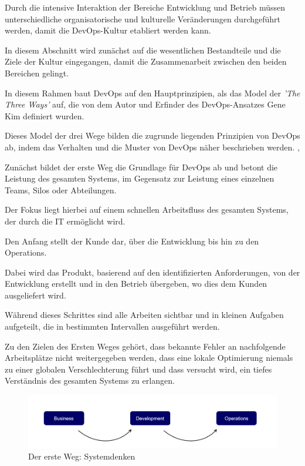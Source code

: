 Durch die intensive Interaktion der Bereiche Entwicklung und Betrieb müssen unterschiedliche organisatorische und kulturelle Veränderungen durchgeführt werden, damit die DevOps-Kultur etabliert werden kann. 

In diesem Abschnitt wird zunächst auf die wesentlichen Bestandteile und die Ziele der Kultur eingegangen, damit die Zusammenarbeit zwischen den beiden Bereichen gelingt.

In diesem Rahmen baut DevOps auf den Hauptprinzipien, als das Model der \textit{'The Three Ways'} auf, die von dem Autor und Erfinder des DevOps-Ansatzes Gene Kim \cite{kim_devops-handbuch_2017} definiert wurden. 

Dieses Model der drei Wege bilden die zugrunde liegenden Prinzipien von DevOps ab, indem das Verhalten und die Muster von DevOps näher beschrieben werden. \cite[S. 9 - 11]{kim_devops-handbuch_2017}, \cite{kim_three_2012}  

Zunächst bildet der erste Weg die Grundlage für DevOps ab und betont die Leistung des gesamten Systems, im Gegensatz zur Leistung eines einzelnen Teams, Silos oder Abteilungen. 

Der Fokus liegt hierbei auf einem schnellen Arbeitsfluss des gesamten Systems, der durch die IT ermöglicht wird. 

Den Anfang stellt der Kunde dar, über die Entwicklung bis hin zu den Operations.

Dabei wird das Produkt, basierend auf den identifizierten Anforderungen, von der Entwicklung erstellt und in den Betrieb übergeben, wo dies dem Kunden ausgeliefert wird. 

Während dieses Schrittes sind alle Arbeiten sichtbar und in kleinen Aufgaben aufgeteilt, die in bestimmten Intervallen ausgeführt werden. 

Zu den Zielen des Ersten Weges gehört, dass bekannte Fehler an nachfolgende Arbeitsplätze nicht weitergegeben werden, dass eine lokale Optimierung niemals zu einer globalen Verschlechterung führt und dass versucht wird, ein tiefes Verständnis des gesamten Systems zu erlangen. 

\begin{figure}[h]
    \centering
    \includegraphics[scale=0.6]{Bilder/First Way.png}
    \caption{Der erste Weg: Systemdenken \cite{kim_three_2012}}
\end{figure}

